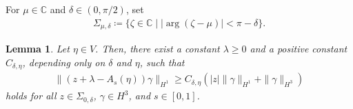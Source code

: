 \documentclass{article}
\newtheorem{lemma}[theorem]{Lemma}
\theoremstyle{remark}
\theoremstyle{definition}
\numberwithin{equation}{section}
\begin{document}
For $\mu\in\mathbb{C}$ and $\delta\in(0,\pi/2)$, set
\begin{align*}
    \Sigma_{\mu,\delta} \coloneqq \{\zeta\in\mathbb{C}\mid|\arg(\zeta-\mu)|<\pi-\delta\}.
\end{align*}

\begin{lemma}
    \label{lem:resolvent_estimate}
    Let $\eta\in V$.
    Then, there exist a constant $\lambda\ge0$ and a positive constant $C_{\delta,\eta}$, depending only on $\delta$ and $\eta$, such that
    \begin{align}
        \|(z+\lambda-A_s(\eta))\gamma\|_{H^1} \ge C_{\delta,\eta}\left(|z|\|\gamma\|_{H^1} + \|\gamma\|_{H^3}\right)
        \label{eq:resolvent_estimate}
    \end{align}
    holds for all $z\in\Sigma_{0,\delta}$, $\gamma\in H^3$, and $s\in[0,1]$.
\end{lemma}
\end{document}
